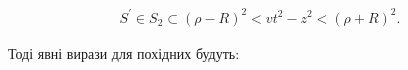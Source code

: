 \begin{equation*} \begin{aligned}
S^\prime \in S_2 \subset (\rho-R)^2 < vt^2 - z^2 < (\rho+R)^2.
\end{aligned} \end{equation*}

Тоді явні вирази для похідних будуть:

%
%
%
